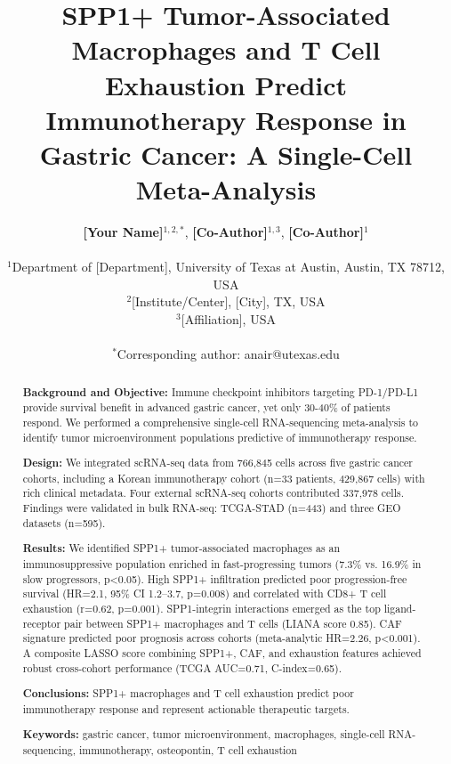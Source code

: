 \documentclass[12pt,twoside]{article}
\title{SPP1+ Tumor-Associated Macrophages and T Cell Exhaustion Predict Immunotherapy Response in Gastric Cancer: A Single-Cell Meta-Analysis}
\author{
    \textbf{[Your Name]}$^{1,2,*}$,
    \textbf{[Co-Author]}$^{1,3}$,
    \textbf{[Co-Author]}$^{1}$ \\
    \\
    $^1$Department of [Department], University of Texas at Austin, Austin, TX 78712, USA \\
    $^2$[Institute/Center], [City], TX, USA \\
    $^3$[Affiliation], USA \\
    \\
    $^*$Corresponding author: anair@utexas.edu
}
\date{}
\begin{document}
\maketitle


\begin{abstract}

\noindent \textbf{Background and Objective:} Immune checkpoint inhibitors targeting PD-1/PD-L1 provide survival benefit in advanced gastric cancer, yet only 30-40\% of patients respond. We performed a comprehensive single-cell RNA-sequencing meta-analysis to identify tumor microenvironment populations predictive of immunotherapy response.

\noindent \textbf{Design:} We integrated scRNA-seq data from 766,845 cells across five gastric cancer cohorts, including a Korean immunotherapy cohort (n=33 patients, 429,867 cells) with rich clinical metadata. Four external scRNA-seq cohorts contributed 337,978 cells. Findings were validated in bulk RNA-seq: TCGA-STAD (n=443) and three GEO datasets (n=595).

\noindent \textbf{Results:} We identified SPP1+ tumor-associated macrophages as an immunosuppressive population enriched in fast-progressing tumors (7.3\% vs. 16.9\% in slow progressors, p<0.05). High SPP1+ infiltration predicted poor progression-free survival (HR=2.1, 95\% CI 1.2--3.7, p=0.008) and correlated with CD8+ T cell exhaustion (r=0.62, p=0.001). SPP1-integrin interactions emerged as the top ligand-receptor pair between SPP1+ macrophages and T cells (LIANA score 0.85). CAF signature predicted poor prognosis across cohorts (meta-analytic HR=2.26, p<0.001). A composite LASSO score combining SPP1+, CAF, and exhaustion features achieved robust cross-cohort performance (TCGA AUC=0.71, C-index=0.65).

\noindent \textbf{Conclusions:} SPP1+ macrophages and T cell exhaustion predict poor immunotherapy response and represent actionable therapeutic targets.

\noindent \textbf{Keywords:} gastric cancer, tumor microenvironment, macrophages, single-cell RNA-sequencing, immunotherapy, osteopontin, T cell exhaustion

\end{abstract}

\clearpage
\end{document}
